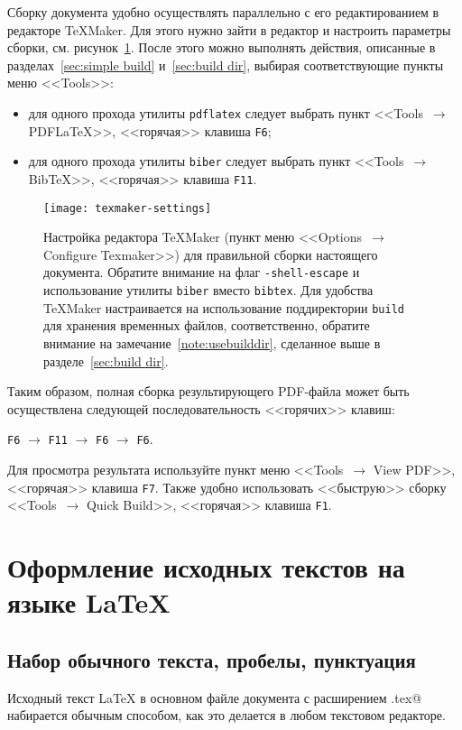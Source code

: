 \documentclass[a4paper, 14pt, reqno, oneside]{extbook}
\begin{document}
Сборку документа удобно осуществлять параллельно с его редактированием в редакторе \TeX Maker. Для этого нужно зайти в редактор и настроить параметры сборки, см. рисунок~\ref{fig:texmaker}. После этого можно выполнять действия, описанные в разделах~\ref{sec:simple build} и~\ref{sec:build dir}, выбирая соответствующие пункты меню <<Tools>>:
\begin{itemize}
\item
    для одного прохода утилиты \texttt{pdflatex} следует выбрать пункт <<Tools~$\to$ PDF\LaTeX>>, <<горячая>> клавиша \texttt{F6};
\item
    для одного прохода утилиты \texttt{biber} следует выбрать пункт <<Tools~$\to$ Bib\TeX>>, <<горячая>> клавиша \texttt{F11}.
\end{itemize}
\begin{figure}
\centerline{\texttt{[image: texmaker-settings]}}
\caption{Настройка редактора \TeX Maker (пункт меню <<Options~$\to$ Configure Texmaker>>) для правильной сборки настоящего документа. Обратите внимание на флаг \texttt{-shell-escape} и использование утилиты \texttt{biber} вместо \texttt{bibtex}. Для удобства \TeX Maker настраивается на использование поддиректории \texttt{build} для хранения временных файлов, соответственно, обратите внимание на замечание~\ref{note:usebuilddir}, сделанное выше в разделе~\ref{sec:build dir}.}
\label{fig:texmaker}
\end{figure}

Таким образом, полная сборка результирующего PDF-файла может быть осуществлена следующей последовательность <<горячих>> клавиш:
\centerline{\texttt{F6} $\to$ \texttt{F11} $\to$ \texttt{F6} $\to$ \texttt{F6}.}

Для просмотра результата используйте пункт меню <<Tools~$\to$ View PDF>>, <<горячая>> клавиша \texttt{F7}.
Также удобно использовать <<быструю>> сборку <<Tools~$\to$ Quick Build>>, <<горячая>> клавиша \texttt{F1}.

\chapter{Оформление исходных текстов на языке \LaTeX}
\label{sec:examples}

\section{Набор обычного текста, пробелы, пунктуация}

Исходный текст \LaTeX\xspace в основном файле документа с расширением \verb@.tex@ набирается обычным способом, как это делается в любом текстовом редакторе.
\end{document}
